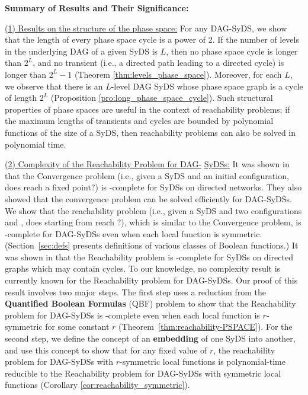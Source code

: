 \smallskip

\noindent
\textbf{Summary of Results and Their Significance:}

\smallskip

\noindent
\underline{(1) Results on the structure of the phase space:}
For any DAG-SyDS, we show that
the length of every phase space cycle is a power of 2.
If the number of levels in the underlying DAG of a given SyDS is $L$,
then no phase space cycle is longer than $2^L$,
and no transient (i.e., a directed path leading to a directed
cycle) is longer than $2^L-1$
(Theorem \ref{thm:levels_phase_space}).
Moreover, for each $L$, we observe that
there is an $L$-level DAG SyDS whose phase 
space graph is a cycle of length $2^L$
(Proposition \ref{pro:long_phase_space_cycle}).
Such structural properties of phase spaces are useful in the context of
reachability problems; if the maximum lengths of transients
and cycles are bounded by polynomial functions of the size of a SyDS,
then reachability problems can also be solved in polynomial time.

\smallskip

\noindent
\underline{(2) Complexity of the Reachability Problem for DAG-}\newline
\underline{SyDSs:} 
It was shown in
\cite{Chistikov-etal-2020} that the Convergence problem
(i.e., given a SyDS \cals{} and an initial configuration,
does \cals{} reach a fixed point?) is \cpsp-complete
for SyDSs on directed networks.
They also showed that the convergence problem can be solved efficiently
for DAG-SyDSs.
We show that the reachability problem
(i.e., given a SyDS \cals{} and two configurations \calc{} and \cald{},
does \cals{} starting from \calc{} reach \cald{}?),
which is similar to the Convergence problem, 
is \cpsp-complete for DAG-SyDSs even
when each local function is symmetric.
(Section~\ref{sec:defs} presents definitions of various classes
of Boolean functions.)
It was shown in \cite{OU-2017} that the Reachability
problem is \cpsp-complete for SyDSs on directed graphs 
which may contain cycles.
To our knowledge, no complexity result is currently known for
the Reachability problem for DAG-SyDSs.
Our proof of this result involves two major steps.
The first step uses a reduction from the \textbf{Quantified Boolean Formulas}
(QBF) problem \cite{GJ-1979} to show that the Reachability problem for DAG-SyDSs is
\cpsp-complete even when each local function is $r$-symmetric for 
some constant $r$ (Theorem~\ref{thm:reachability-PSPACE}).
For the second step,
we define the concept of an \textbf{embedding} of one SyDS into another,
and use this concept to show that
for any fixed value of $r$, 
the reachability problem for DAG-SyDSs with $r$-symmetric local functions 
is polynomial-time reducible to the Reachability problem for DAG-SyDSs with
symmetric  local functions (Corollary \ref{cor:reachability_symmetric}).

